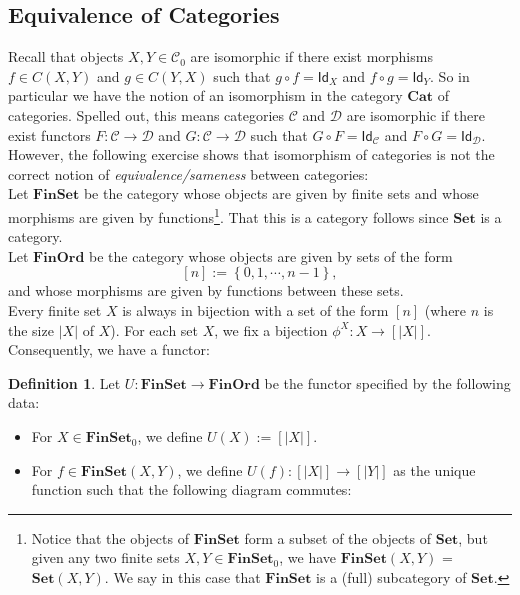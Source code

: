 \documentclass[a4paper,11pt, oneside,titlepage=false]{scrbook}
\theoremstyle{plain}
\theoremstyle{definition}
\newtheorem{dfn}[thm]{Definition}
\newcommand{\cfont}[1]{\ensuremath{\mathsf{#1}}}
\newcommand{\Cat}[1]{\mathcal{#1}}
\newcommand{\CC}{\Cat{C}}
\newcommand{\DD}{\Cat{D}}
\newcommand{\Catb}[1]{\mathbf{#1}}
\newcommand{\SET}{\Catb{Set}}
\newcommand{\FINSET}{\Catb{FinSet}}
\newcommand{\CAT}{\Catb{Cat}}
\newcommand{\Ob}[1]{{#1}_0}
\newcommand{\CHom}[3]{{#1}(#2,#3)}
\newcommand{\Id}[1][]{\cfont{Id}_{#1}}
\newcommand{\co}[2]{\ensuremath{#2 \circ #1}}
\begin{document}
\subsection{Equivalence of Categories}
Recall that objects $X,Y\in\Ob{\CC}$ are isomorphic if there exist morphisms $f\in\CHom{C}{X}{Y}$ and $g\in\CHom{C}{Y}{X}$ such that $\co{f}{g} = \Id[X]$ and $\co{g}{f} = \Id[Y]$. So in particular we have the notion of an isomorphism in the category $\CAT$ of categories. Spelled out, this means categories $\CC$ and $\DD$ are isomorphic if there exist functors $F:\CC\to\DD$ and $G:\CC\to\DD$ such that $\co{F}{G}= \Id[\CC]$ and $\co{G}{F} = \Id[\DD]$.\\
However, the following exercise shows that isomorphism of categories is not the correct notion of \textit{equivalence/sameness} between categories:\\
Let $\FINSET$ be the category whose objects are given by finite sets and whose morphisms are given by functions\footnote{Notice that the objects of $\FINSET$ form a subset of the objects of $\SET$, but given any two finite sets $X,Y \in \Ob{\FINSET}$, we have $\CHom{\FINSET}{X}{Y}$ = $\CHom{\SET}{X}{Y}$. We say in this case that $\FINSET$ is a (full) subcategory of $\SET$.}. That this is a category follows since $\SET$ is a category.\\
Let $\Catb{FinOrd}$ be the category whose objects are given by sets of the form 
\[
[n] := \left\{0,1,\cdots,n-1\right\},
\]
and whose morphisms are given by functions between these sets.\\
Every finite set $X$ is always in bijection with a set of the form $[n]$ (where $n$ is the size $\vert X\vert$ of $X$). For each set $X$, we fix a bijection $\phi^X: X\to [\vert X\vert]$. Consequently, we have a functor:
\begin{dfn} Let $U: \FINSET\to \Catb{FinOrd}$ be the functor specified by the following data:
\begin{itemize}
\item For $X\in \Ob{\FINSET}$, we define $U(X) := [\vert X\vert]$.
\item For $f\in \CHom{\FINSET}{X}{Y}$, we define $U(f): [\vert X\vert]\to [\vert Y\vert]$ as the unique function such that the following diagram commutes:
\begin{center}
\end{center}
\end{itemize}
\end{dfn}
\end{document}
